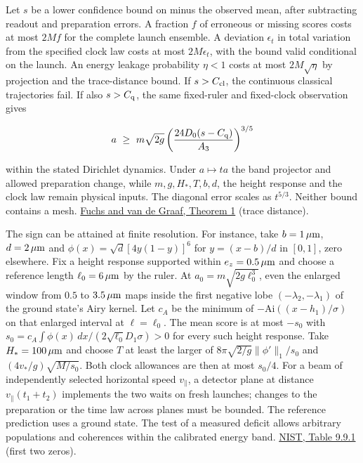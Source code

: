 \documentclass[11pt,a4paper]{article}
\begin{document}
Let \(s\) be a lower confidence bound on minus the observed mean, after
subtracting readout and preparation errors. A fraction \(f\) of
erroneous or missing scores costs at most \(2Mf\) for the complete
launch ensemble. A deviation \(\epsilon_t\) in total variation from the
specified clock law costs at most \(2M\epsilon_t\), with the bound valid
conditional on the launch. An energy leakage probability \(\eta<1\)
costs at most \(2M\sqrt\eta\) by projection and the trace-distance
bound. If \(s>C_{\rm cl}\), the continuous classical trajectories fail.
If also \(s>C_{\rm q}\), the same fixed-ruler and fixed-clock
observation gives

\[
 a\ \ge\ m\sqrt{2g}
   \left(\frac{24D_0(s-C_{\rm q})}{A_3}\right)^{3/5}
\]

within the stated Dirichlet dynamics. Under \(a\mapsto t a\) the band
projector and allowed preparation change, while \(m,g,H_*,T,b,d\), the
height response and the clock law remain physical inputs. The diagonal
error scales as \(t^{5/3}\). Neither bound contains a mesh.
\href{https://arxiv.org/abs/quant-ph/9712042}{Fuchs and van de Graaf,
Theorem 1} (trace distance).

The sign can be attained at finite resolution. For instance, take
\(b=1\,\mu{\rm m}\), \(d=2\,\mu{\rm m}\) and
\(\phi(x)=\sqrt d[4y(1-y)]^6\) for \(y=(x-b)/d\) in \([0,1]\), zero
elsewhere. Fix a height response supported within
\(e_z=0.5\,\mu{\rm m}\) and choose a reference length
\(\ell_0=6\,\mu{\rm m}\) by the ruler. At \(a_0=m\sqrt{2g\ell_0^3}\),
even the enlarged window from \(0.5\) to \(3.5\,\mu{\rm m}\) maps inside
the first negative lobe \((-\lambda_2,-\lambda_1)\) of the ground
state's Airy kernel. Let \(c_A\) be the minimum of
\(-\mathrm{Ai}((x-h_1)/\sigma)\) on that enlarged interval at
\(\ell=\ell_0\). The mean score is at most \(-s_0\) with
\(s_0=c_A\int\phi(x)\,dx/(2\sqrt{\ell_0}D_1\sigma)>0\) for every such
height response. Take \(H_*=100\,\mu{\rm m}\) and choose \(T\) at least
the larger of \(8\pi\sqrt{2/g}\|\phi'\|_1/s_0\) and
\((4v_*/g)\sqrt{M/s_0}\). Both clock allowances are then at most
\(s_0/4\). For a beam of independently selected horizontal speed
\(v_\parallel\), a detector plane at distance \(v_\parallel(t_1+t_2)\)
implements the two waits on fresh launches; changes to the preparation
or the time law across planes must be bounded. The reference prediction
uses a ground state. The test of a measured deficit allows arbitrary
populations and coherences within the calibrated energy band.
\href{https://dlmf.nist.gov/9.9\#T1}{NIST, Table 9.9.1} (first two
zeros).
\end{document}
